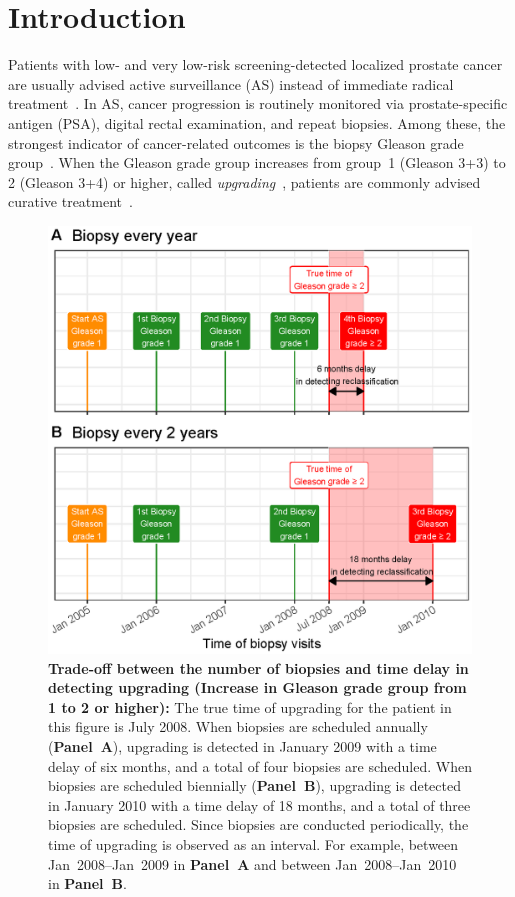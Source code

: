 \section{Introduction}
Patients with low- and very low-risk screening-detected localized prostate cancer are usually advised active surveillance (AS) instead of immediate radical treatment~\citep{briganti2018active}. In AS, cancer progression is routinely monitored via prostate-specific antigen (PSA), digital rectal examination, and repeat biopsies. Among these, the strongest indicator of cancer-related outcomes is the biopsy Gleason grade group~\citep{epsteinGG2014}. When the Gleason grade group increases from group~1 (Gleason 3+3) to 2 (Gleason 3+4) or higher, called \textit{upgrading}~\citep{bruinsma2017expert}, patients are commonly advised curative treatment~\citep{bul2013active}.

\begin{figure}
\centerline{\includegraphics[width=\columnwidth]{images/delay_explanation.eps}}
\caption{\textbf{Trade-off between the number of biopsies and time delay in detecting upgrading (Increase in Gleason grade group from 1 to 2 or higher):} The true time of upgrading for the patient in this figure is July 2008. When biopsies are scheduled annually (\textbf{Panel~A}), upgrading is detected in January 2009 with a time delay of six months, and a total of four biopsies are scheduled. When biopsies are scheduled biennially (\textbf{Panel~B}), upgrading is detected in January 2010 with a time delay of 18 months, and a total of three biopsies are scheduled. Since biopsies are conducted periodically, the time of upgrading is observed as an interval. For example, between Jan~2008--Jan~2009 in \textbf{Panel~A} and between Jan~2008--Jan~2010 in \textbf{Panel~B}.}
\label{fig:delay_explanation}
\end{figure}

